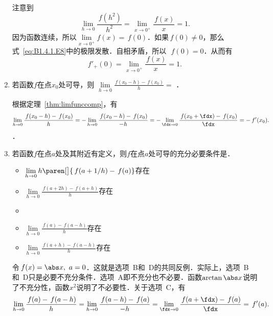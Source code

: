 \begin{enumerate}
  \ifshowsol
  注意到
  \begin{equation}
    \lim_{h\to0} \frac{\,f(h^2)}{h^2} = \!\lim_{\,x\to0^+\!} \!\frac{\,f(x)}{x} = 1.
    \label{eq:B1.4.1.E8}
  \end{equation}
  因为函数连续，所以\(\!\lim\limits_{x\to0^+} f(x) = \,f(0)\)．如果\(\,f(0) \ne 0\)，那么式~\eqref{eq:B1.4.1.E8}中的极限发散．自相矛盾，所以~\(\,f(0) = 0\)．从而有
  \begin{equation*}
    f'_+(0)
    = \!\lim_{\,x\to0^+\!} \!\frac{\,f(x)}{x} = 1.
  \end{equation*}
  \fi

\item 若函数\(f\)在点\(x_0\)处可导，则
  \begin{math}
    \lim\limits_{h\to0} \frac{\,f(x_0-h) - \,f(x_0)}{h} =
  \end{math}
  \ifshowsol
  {\setlength{\ULdepth}{.9ex}%
    \uline{}}．

  根据定理~\ref{thm:limfunccomp}，有
  \begin{equation*}
    \lim_{h\to0} \frac{\,f(x_0-h) - \,f(x_0)}{h}
    = - \lim_{h\to0} \frac{\,f(x_0-h) - \,f(x_0)}{-h}
    = - \lim_{\fdx\to0} \frac{\,f(x_0+\fdx) - \,f(x_0)}{\fdx}
    = - \,f'(x_0).
  \end{equation*}
  \else
  \uline{\hspace{6em}}．
  \fi

\item 若函数\(f\)在点\(a\)处及其附近有定义，则\(f\)在点\(a\)处可导的充分必要条件是\uline{\hfill}．
  \begin{itemize}
    \renewcommand{\labelitemi}{\faCircleThin}
  \item \(\lim\limits_{h\to0} h\paren[\big]{\,f(a+1/h) - \,f(a)}\)存在
  \item \(\lim\limits_{h\to0} \frac{\,f(a+2h) - \,f(a+h)}{h}\)存在
    \ifshowsol
  \item[\faCircle]
    \else
  \item
    \fi
    \(\lim\limits_{h\to0} \frac{\,f(a) - \,f(a-h)}{h}\)存在
  \item \(\lim\limits_{h\to0} \frac{\,f(a+h) - \,f(a-h)}{h}\)存在
  \end{itemize}

  \ifshowsol
  令\(\,f(x) = \abs x,\ a = 0\)．这就是选项~B和~D的共同反例．实际上，选项~B和~D只是必要不充分条件．选项~A即不充分也不必要．函数\(\arctan\abs x\)说明了不充分性，函数\(x^2\)说明了不必要性．关于选项~C，有
  \begin{equation*}
    \lim_{h\to0} \frac{\,f(a) - \,f(a-h)}{h}
    = \lim_{h\to0} \frac{\,f(a-h) - \,f(a)}{-h}
    = \lim_{\fdx\to0} \frac{\,f(a+\fdx) - \,f(a)}{\fdx}
    = \,f'(a).
  \end{equation*}
  \fi


\end{enumerate}
